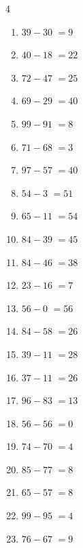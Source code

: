 \begin{multicols}{4}
\begin{enumerate}
  \item $39-30$
        $=9$

  \item $40-18$
        $=22$

  \item $72-47$
        $=25$

  \item $69-29$
        $=40$

  \item $99-91$
        $=8$

  \item $71-68$
        $=3$

  \item $97-57$
        $=40$

  \item $54-3$
        $=51$

  \item $65-11$
        $=54$

  \item $84-39$
        $=45$

  \item $84-46$
        $=38$

  \item $23-16$
        $=7$

  \item $56-0$
        $=56$

  \item $84-58$
        $=26$

  \item $39-11$
        $=28$

  \item $37-11$
        $=26$

  \item $96-83$
        $=13$

  \item $56-56$
        $=0$

  \item $74-70$
        $=4$

  \item $85-77$
        $=8$

  \item $65-57$
        $=8$

  \item $99-95$
        $=4$

\columnbreak %

  \item $76-67$
        $=9$


\end{enumerate}
\end{multicols}
